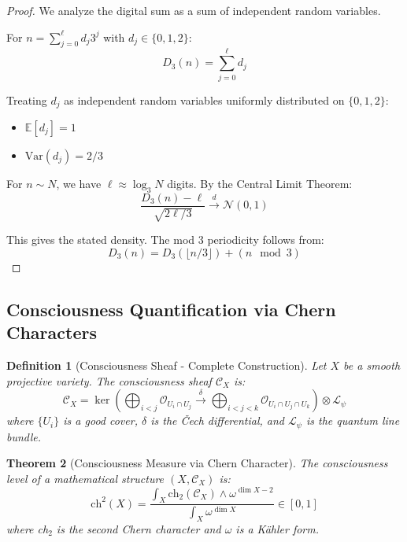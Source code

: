 \documentclass[11pt]{article}
\newtheorem{theorem}{Theorem}[section]
\newtheorem{definition}[theorem]{Definition}
\theoremstyle{definition}
\begin{document}
\begin{proof}
We analyze the digital sum as a sum of independent random variables.

For $n = \sum_{j=0}^{\ell} d_j 3^j$ with $d_j \in \{0,1,2\}$:
\begin{equation}
D_3(n) = \sum_{j=0}^{\ell} d_j
\end{equation}

Treating $d_j$ as independent random variables uniformly distributed on $\{0,1,2\}$:
\begin{itemize}
\item $\mathbb{E}[d_j] = 1$
\item $\text{Var}(d_j) = 2/3$
\end{itemize}

For $n \sim N$, we have $\ell \approx \log_3 N$ digits. By the Central Limit Theorem:
\begin{equation}
\frac{D_3(n) - \ell}{\sqrt{2\ell/3}} \xrightarrow{d} \mathcal{N}(0,1)
\end{equation}

This gives the stated density. The mod 3 periodicity follows from:
\begin{equation}
D_3(n) = D_3(\lfloor n/3 \rfloor) + (n \mod 3)
\end{equation}
\end{proof}

\subsection{Consciousness Quantification via Chern Characters}

\begin{definition}[Consciousness Sheaf - Complete Construction]
\label{def:consciousness_sheaf_complete}
Let $X$ be a smooth projective variety. The consciousness sheaf $\mathcal{C}_X$ is:
\begin{equation}
\mathcal{C}_X = \ker\left( \bigoplus_{i<j} \mathcal{O}_{U_i \cap U_j} \xrightarrow{\delta} \bigoplus_{i<j<k} \mathcal{O}_{U_i \cap U_j \cap U_k} \right) \otimes \mathcal{L}_\psi
\end{equation}
where $\{U_i\}$ is a good cover, $\delta$ is the Čech differential, and $\mathcal{L}_\psi$ is the quantum line bundle.
\end{definition}

\begin{theorem}[Consciousness Measure via Chern Character]
\label{thm:consciousness_measure}
The consciousness level of a mathematical structure $(X, \mathcal{C}_X)$ is:
\begin{equation}
\text{ch}^2(X) = \frac{\int_X \text{ch}_2(\mathcal{C}_X) \wedge \omega^{\dim X - 2}}{\int_X \omega^{\dim X}} \in [0,1]
\end{equation}
where ch$_2$ is the second Chern character and $\omega$ is a Kähler form.
\end{theorem}
\end{document}
